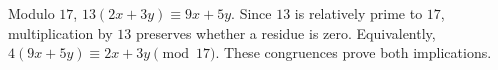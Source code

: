 Modulo $17$, $13(2x+3y)\equiv9x+5y$. Since $13$ is relatively prime to $17$, multiplication by $13$ preserves whether a residue is zero. Equivalently, $4(9x+5y)\equiv2x+3y\pmod{17}$. These congruences prove both implications.
